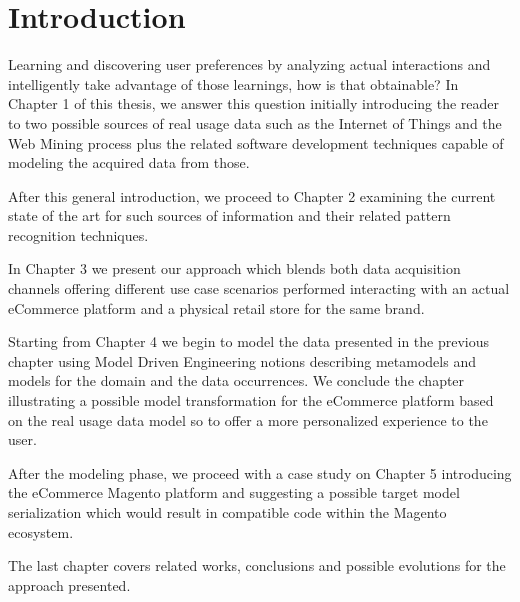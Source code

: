
\chapter*{Introduction}

Learning and discovering user preferences by analyzing actual interactions and intelligently take advantage of those learnings, how is that obtainable?  In Chapter 1 of this thesis, we answer this question initially introducing the reader to two possible sources of real usage data such as the Internet of Things and the Web Mining process plus the related software development techniques capable of modeling the acquired data from those.

After this general introduction, we proceed to Chapter 2 examining the current state of the art for such sources of information and their related pattern recognition techniques.

In Chapter 3 we present our approach which blends both data acquisition channels offering different use case scenarios performed interacting with an actual eCommerce platform and a physical retail store for the same brand.

Starting from Chapter 4 we begin to model the data presented in the previous chapter using Model Driven Engineering notions describing metamodels and models for the domain and the data occurrences. We conclude the chapter illustrating a possible model transformation for the eCommerce platform based on the real usage data model so to offer a more personalized experience to the user.

After the modeling phase, we proceed with a case study on Chapter 5 introducing the eCommerce Magento platform and suggesting a possible target model serialization which would result in compatible code within the Magento ecosystem.

The last chapter covers related works, conclusions and possible evolutions for the approach presented.

